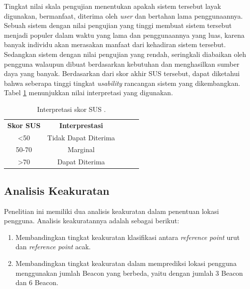 \par Tingkat nilai skala pengujian menentukan apakah sistem tersebut layak digunakan, bermanfaat, diterima oleh \textit{user} dan bertahan lama penggunaannya. Sebuah sistem dengan nilai pengujian yang tinggi membuat sistem tersebut menjadi populer dalam waktu yang lama dan penggunaannya yang luas, karena banyak individu akan merasakan manfaat dari kehadiran sistem tersebut. Sedangkan sistem dengan nilai pengujian yang rendah, seringkali diabaikan oleh pengguna walaupun dibuat berdasarkan kebutuhan dan menghasilkan sumber daya yang banyak. Berdasarkan dari skor akhir SUS tersebut, dapat diketahui bahwa seberapa tinggi tingkat \textit{usability} rancangan sistem yang dikembangkan. Tabel \ref{tabelsus} menunjukkan nilai interpretasi yang digunakan.

\begin{table}[H]
	\center
	\caption{Interpretasi skor SUS \citep{Bangoor2009}.}
	\label{tabelsus}
	\begin{tabular}{|c|c|lll}
		\cline{1-2}
		\textbf{Skor SUS} & \textbf{Interprestasi} &  &  & \\ \cline{1-2}
		\textless{}50     & Tidak Dapat Diterima   &  &  & \\ \cline{1-2}
		50-70             & Marginal               &  &  & \\ \cline{1-2}
		\textgreater{}70  & Dapat Diterima         &  &  & \\ \cline{1-2}
	\end{tabular}
\end{table}

\subsection{Analisis Keakuratan}
Penelitian ini memiliki dua analisis keakuratan dalam penentuan lokasi pengguna. Analisis keakuratannya adalah sebagai berikut:
\begin{enumerate}[1.]
	\item Membandingkan tingkat keakuratan klasifikasi antara \textit{reference point} urut dan \textit{reference point} acak.
	\item Membandingkan tingkat keakuratan dalam memprediksi lokasi pengguna menggunakan jumlah Beacon yang berbeda, yaitu dengan jumlah 3 Beacon dan 6 Beacon.
\end{enumerate}
